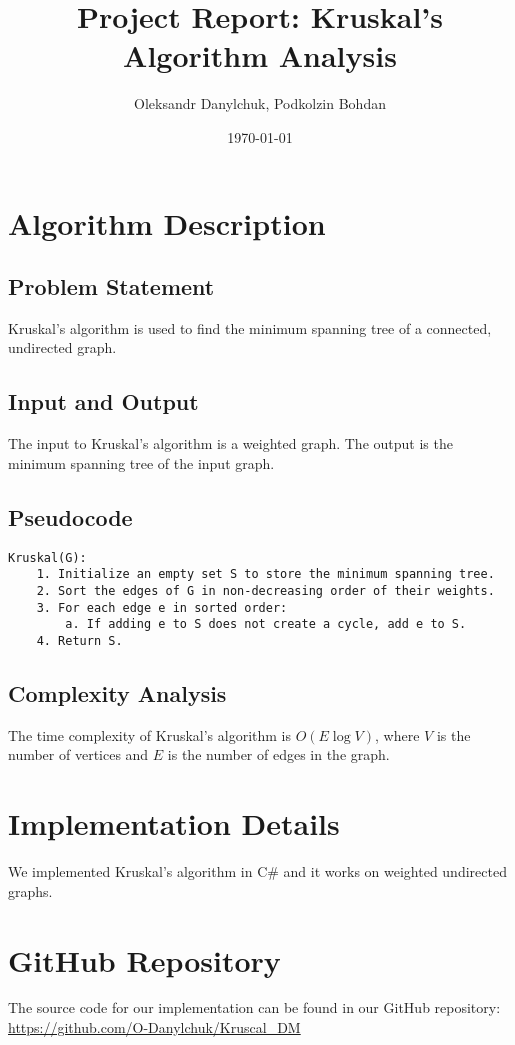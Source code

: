 \documentclass{article}
\begin{document}
\title{Project Report: Kruskal's Algorithm Analysis}
\author{Oleksandr Danylchuk, Podkolzin Bohdan}
\date{\today}
\maketitle

\section{Algorithm Description}
\subsection{Problem Statement}
Kruskal's algorithm is used to find the minimum spanning tree of a connected, undirected graph.

\subsection{Input and Output}
The input to Kruskal's algorithm is a weighted graph. The output is the minimum spanning tree of the input graph.

\subsection{Pseudocode}
\begin{verbatim}
Kruskal(G):
    1. Initialize an empty set S to store the minimum spanning tree.
    2. Sort the edges of G in non-decreasing order of their weights.
    3. For each edge e in sorted order:
        a. If adding e to S does not create a cycle, add e to S.
    4. Return S.
\end{verbatim}

\subsection{Complexity Analysis}
The time complexity of Kruskal's algorithm is \(O(E \log V)\), where \(V\) is the number of vertices and \(E\) is the number of edges in the graph.

\section{Implementation Details}
We implemented Kruskal's algorithm in C\# and it works on weighted undirected graphs.

\section{GitHub Repository}
The source code for our implementation can be found in our GitHub repository: \\
\url{https://github.com/O-Danylchuk/Kruscal_DM}
\end{document}
